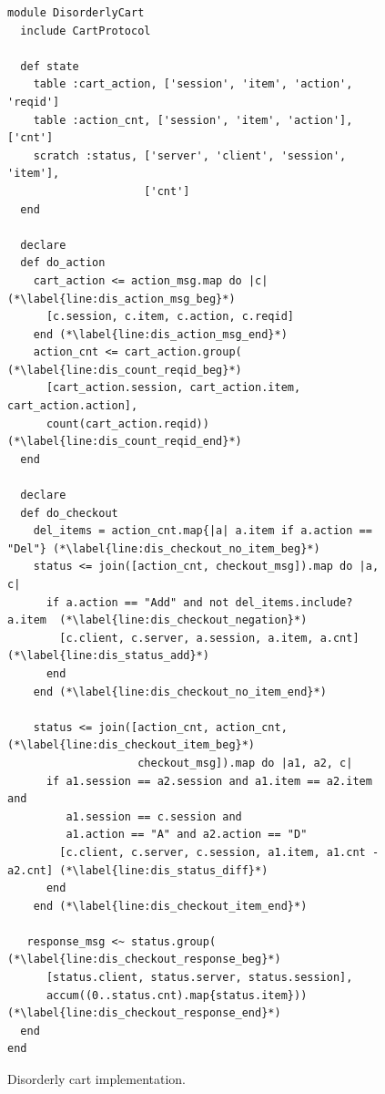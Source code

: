 \begin{figure}[t]
\begin{scriptsize}
\begin{lstlisting}
module DisorderlyCart
  include CartProtocol

  def state
    table :cart_action, ['session', 'item', 'action', 'reqid']
    table :action_cnt, ['session', 'item', 'action'], ['cnt']
    scratch :status, ['server', 'client', 'session', 'item'],
                     ['cnt']
  end

  declare
  def do_action
    cart_action <= action_msg.map do |c| (*\label{line:dis_action_msg_beg}*)
      [c.session, c.item, c.action, c.reqid] 
    end (*\label{line:dis_action_msg_end}*)
    action_cnt <= cart_action.group(  (*\label{line:dis_count_reqid_beg}*)
      [cart_action.session, cart_action.item, cart_action.action],
      count(cart_action.reqid))  (*\label{line:dis_count_reqid_end}*)
  end

  declare
  def do_checkout
    del_items = action_cnt.map{|a| a.item if a.action == "Del"} (*\label{line:dis_checkout_no_item_beg}*)
    status <= join([action_cnt, checkout_msg]).map do |a, c|
      if a.action == "Add" and not del_items.include? a.item  (*\label{line:dis_checkout_negation}*)
        [c.client, c.server, a.session, a.item, a.cnt] (*\label{line:dis_status_add}*)
      end
    end (*\label{line:dis_checkout_no_item_end}*)

    status <= join([action_cnt, action_cnt, (*\label{line:dis_checkout_item_beg}*)
                    checkout_msg]).map do |a1, a2, c|
      if a1.session == a2.session and a1.item == a2.item and
         a1.session == c.session and
         a1.action == "A" and a2.action == "D"
        [c.client, c.server, c.session, a1.item, a1.cnt - a2.cnt] (*\label{line:dis_status_diff}*)
      end
    end (*\label{line:dis_checkout_item_end}*)

   response_msg <~ status.group( (*\label{line:dis_checkout_response_beg}*)
      [status.client, status.server, status.session],
      accum((0..status.cnt).map{status.item})) (*\label{line:dis_checkout_response_end}*)
  end
end
\end{lstlisting}
\vspace{-10pt}
\caption{Disorderly cart implementation.}
\label{fig:dis-cart}
\end{scriptsize}
\vspace{-2pt}
\end{figure}

